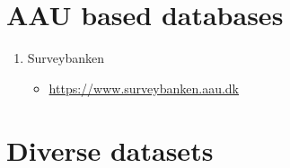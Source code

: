 \documentclass[
]{book}
\providecommand{\tightlist}{%
  \setlength{\itemsep}{0pt}\setlength{\parskip}{0pt}}
\begin{document}
\hypertarget{aau-based-databases}{%
\section{AAU based databases}\label{aau-based-databases}}

\begin{enumerate}
\def\labelenumi{\arabic{enumi}.}
\tightlist
\item
  Surveybanken

  \begin{itemize}
  \tightlist
  \item
    \url{https://www.surveybanken.aau.dk}
  \end{itemize}
\end{enumerate}

\hypertarget{diverse-datasets}{%
\section{Diverse datasets}\label{diverse-datasets}}
\end{document}
